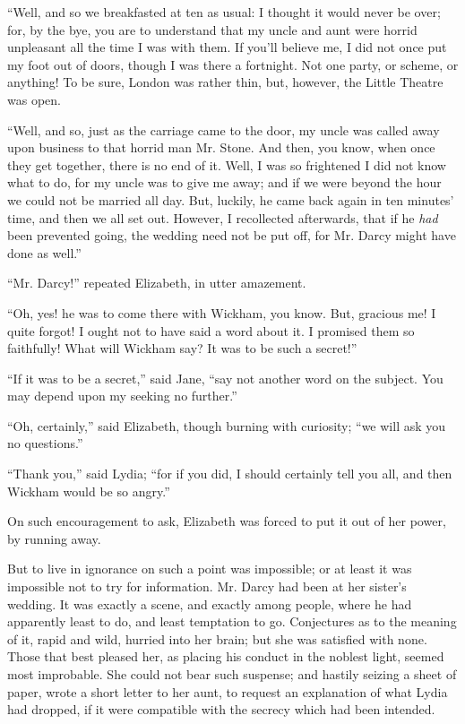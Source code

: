 \documentclass[12pt,openright]{book}
\begin{document}
“Well, and so we breakfasted at ten as usual: I thought it would never be over; for, by the bye, you are to understand that my uncle and aunt were horrid unpleasant all the time I was with them. If you’ll believe me, I did not once put my foot out of doors, though I was there a fortnight. Not one party, or scheme, or anything! To be sure, London was rather thin, but, however, the Little Theatre was open.

“Well, and so, just as the carriage came to the door, my uncle was called away upon business to that horrid man Mr. Stone. And then, you know, when once they get together, there is no end of it. Well, I was so frightened I did not know what to do, for my uncle was to give me away; and if we were beyond the hour we could not be married all day. But, luckily, he came back again in ten minutes’ time, and then we all set out. However, I recollected afterwards, that if he \textit{had} been prevented going, the wedding need not be put off, for Mr. Darcy might have done as well.”

“Mr. Darcy!” repeated Elizabeth, in utter amazement.

“Oh, yes! he was to come there with Wickham, you know. But, gracious me! I quite forgot! I ought not to have said a word about it. I promised them so faithfully! What will Wickham say? It was to be such a secret!”

“If it was to be a secret,” said Jane, “say not another word on the subject. You may depend upon my seeking no further.”

“Oh, certainly,” said Elizabeth, though burning with curiosity; “we will ask you no questions.”

“Thank you,” said Lydia; “for if you did, I should certainly tell you all, and then Wickham would be so angry.”

On such encouragement to ask, Elizabeth was forced to put it out of her power, by running away.

But to live in ignorance on such a point was impossible; or at least it was impossible not to try for information. Mr. Darcy had been at her sister’s wedding. It was exactly a scene, and exactly among people, where he had apparently least to do, and least temptation to go. Conjectures as to the meaning of it, rapid and wild, hurried into her brain; but she was satisfied with none. Those that best pleased her, as placing his conduct in the noblest light, seemed most improbable. She could not bear such suspense; and hastily seizing a sheet of paper, wrote a short letter to her aunt, to request an explanation of what Lydia had dropped, if it were compatible with the secrecy which had been intended.
\end{document}
